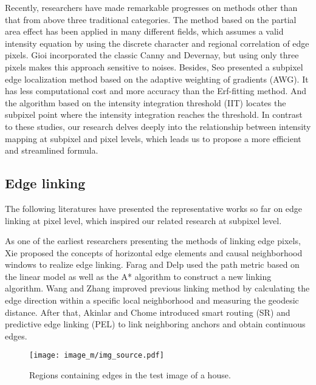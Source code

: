Recently, researchers\cite{Gioi2017ASE,Seo2018SubpixelEL,TrujilloPino2013AccurateSE,Chu2020SubpixelDM} have made remarkable progresses on methods other than that from above three traditional categories.
The method based on the partial area effect\cite{TrujilloPino2013AccurateSE} has been applied in many different fields\cite{LI2022Visual,Lu2022ANS,poyraz2024sub}, which assumes a valid intensity equation by using the discrete character and regional correlation of edge pixels.
Gioi\cite{Gioi2017ASE} incorporated the classic Canny and Devernay, but using only three pixels makes this approach sensitive to noises. Besides, Seo\cite{Seo2018SubpixelEL} presented a subpixel edge localization method based on the adaptive weighting of gradients (AWG). It has less computational cost and more accuracy than the Erf-fitting method.
And the algorithm based on the intensity integration threshold (IIT)\cite{Chu2020SubpixelDM} locates the subpixel point where the intensity integration reaches the threshold. 
In contrast to these studies, our research delves deeply into the relationship between intensity mapping at subpixel and pixel levels, which leads us to propose a more efficient and streamlined formula.

\subsection{Edge linking}
The following literatures \cite{XIE1992647, FaragandDelp,Ghita2002479,Wang,Topal2012EdgeDA,Akinlar2016PELAP,Seo2019SubpixelLL} have presented the representative works so far on edge linking at pixel level, which inspired our related research at subpixel level.

As one of the earliest researchers presenting the methods of linking edge pixels, Xie\cite{XIE1992647} proposed the concepts of horizontal edge elements and causal neighborhood windows to realize edge linking. 
Farag and Delp\cite{FaragandDelp} used the path metric based on the linear model as well as the A* algorithm to construct a new linking algorithm. Wang and Zhang \cite{Wang} improved previous linking method by calculating the edge direction within a specific local neighborhood and measuring the geodesic distance. After that, Akinlar and Chome\cite{Topal2012EdgeDA,Akinlar2016PELAP} introduced smart routing (SR) and predictive edge linking (PEL) to link neighboring anchors and obtain continuous edges.

\begin{figure}[t]
    \centering
    \texttt{[image: image\_m/img\_source.pdf]} 
    \caption{Regions containing edges in the test image of a house.}
    \label{fig_s}
\end {figure}

